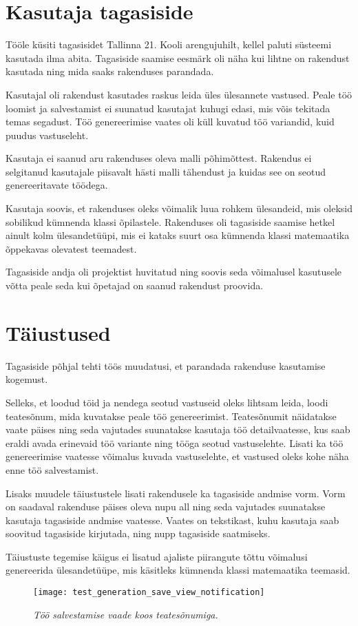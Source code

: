 \section{Kasutaja tagasiside}

Tööle küsiti tagasisidet Tallinna 21. Kooli arengujuhilt, kellel paluti süsteemi kasutada ilma abita. Tagasiside saamise eesmärk oli näha kui lihtne on rakendust kasutada ning mida saaks rakenduses parandada.

Kasutajal oli rakendust kasutades raskus leida üles ülesannete vastused. Peale töö loomist ja salvestamist ei suunatud kasutajat kuhugi edasi, mis võis tekitada temas segadust. Töö genereerimise vaates oli küll kuvatud töö variandid, kuid puudus vastuseleht.

Kasutaja ei saanud aru rakenduses oleva malli põhimõttest. Rakendus ei selgitanud kasutajale piisavalt hästi malli tähendust ja kuidas see on seotud genereeritavate töödega.

Kasutaja soovis, et rakenduses oleks võimalik luua rohkem ülesandeid, mis oleksid sobilikud kümnenda klassi õpilastele. Rakenduses oli tagasiside saamise hetkel ainult kolm ülesandetüüpi, mis ei kataks suurt osa kümnenda klassi matemaatika õppekavas olevatest teemadest.

Tagasiside andja oli projektist huvitatud ning soovis seda võimalusel kasutusele võtta peale seda kui õpetajad on saanud rakendust proovida.

\section{Täiustused}

Tagasiside põhjal tehti töös muudatusi, et parandada rakenduse kasutamise kogemust.

Selleks, et loodud töid ja nendega seotud vastuseid oleks lihtsam leida, loodi teatesõnum, mida kuvatakse peale töö genereerimist. Teatesõnumit näidatakse vaate päises ning seda vajutades suunatakse kasutaja töö detailvaatesse, kus saab eraldi avada erinevaid töö variante ning tööga seotud vastuselehte. Lisati ka töö genereerimise vaatesse võimalus kuvada vastuselehte, et vastused oleks kohe näha enne töö salvestamist.

Lisaks muudele täiustustele lisati rakendusele ka tagasiside andmise vorm. Vorm on saadaval rakenduse päises oleva nupu all ning seda vajutades suunatakse kasutaja tagasiside andmise vaatesse. Vaates on tekstikast, kuhu kasutaja saab soovitud tagasiside kirjutada, ning nupp tagasiside saatmiseks.

Täiustuste tegemise käigus ei lisatud ajaliste piirangute tõttu võimalusi genereerida ülesandetüüpe, mis käsitleks kümnenda klassi matemaatika teemasid.

\begin{figure}[H]
    \centering
    \texttt{[image: test\_generation\_save\_view\_notification]}
    \caption{\emph{Töö salvestamise vaade koos teatesõnumiga.}}
    \label{fig:test_generation_save_view_notification}
\end{figure}
